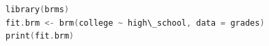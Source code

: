 \begin{lstlisting}[language=c++,label={code:27_04},caption={Trying Bayesian estimation}]
library(brms)
fit.brm <- brm(college ~ high\_school, data = grades)
print(fit.brm)
\end{lstlisting}
